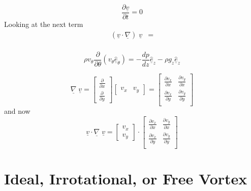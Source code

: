 \begin{equation*}
  \frac{\partial\underline{v}}{\partial{}t}=0
\end{equation*}
Looking at the next term
\begin{equation*}
  \begin{split}
    (\underline{v}\cdot\underline{\nabla})\;\underline{v}
    &= \\
  \end{split}
\end{equation*}

\begin{equation*}
  \rho{}v_{\theta}\frac{\partial}{\partial\theta}(v_{\theta}\hat{\underline{e}}_{\theta})=-\frac{dp}{dz}\hat{\underline{e}}_{z}-\rho{}g_{z}\hat{\underline{e}}_{z}
\end{equation*}

\begin{equation*}
  \underline{\nabla}\;\underline{v}=
  \begin{bmatrix}
    \frac{\partial}{\partial{}x} \\ \frac{\partial}{\partial{}y}
  \end{bmatrix}
  \begin{bmatrix}
    v_{x} & v_{y}
  \end{bmatrix}=
  \begin{bmatrix}
    \frac{\partial{}v_{x}}{\partial{}x} & \frac{\partial{}v_{y}}{\partial{}x} \\
    \frac{\partial{}v_{x}}{\partial{}y} & \frac{\partial{}v_{y}}{\partial{}y} \\
  \end{bmatrix}
\end{equation*}
and now
\begin{equation*}
  \underline{v}\cdot\underline{\nabla}\;\underline{v}=
  \begin{bmatrix}
    v_{x} \\
    v_{y}
  \end{bmatrix}
  \cdot
  \begin{bmatrix}
    \frac{\partial{}v_{x}}{\partial{}x} & \frac{\partial{}v_{y}}{\partial{}x} \\
    \frac{\partial{}v_{x}}{\partial{}y} & \frac{\partial{}v_{y}}{\partial{}y} \\
  \end{bmatrix}
\end{equation*}

\section{Ideal, Irrotational, or Free Vortex}

